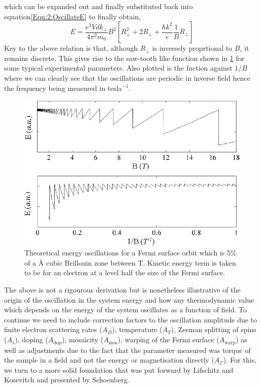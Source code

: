 which can be expanded out and finally substituted back into equation\ref{Eqn:2:OscillateE} to finally obtain,
\begin{equation}
\label{Eqn:2:OscIllustration}
E = \frac{e^2Vdk_\perp}{4\pi^2m_0}B^2\left[R_\perp^2 + 2R_\perp + \frac{\hbar k^2}{e}\frac{1}{B}R_\perp\right]
\end{equation}
Key to the above relation is that, although $R_\perp$ is inversely proprtional to $B$, it remains discrete. This gives rise to the saw-tooth like function shown in \fig\ref{Fig:2:EnergyOscillations} for some typical experimental parameters. Also plotted is the fuction against $1/B$ where we can clearly see that the oscillations are periodic in inverse field hence the frequency being measured in tesla$^{-1}$.
\begin{figure}[htbp]
    \begin{center}
        \includegraphics[scale=0.9]{Chapter2-ExperimentalTechnique/Figures/TheoreticalOscillations/TheoreticalOscillations}
        \caption{Theoretical energy oscillations for a Fermi surface orbit which is 5\% of a \unit[5]{\AA} cubic Brillouin zone between \unit[1--18]{T}. Kinetic energy term is taken to be for an electron at a level half the size of the Fermi surface.}
        \label{Fig:2:EnergyOscillations}
    \end{center}
\end{figure}

The above is not a rigourous derivation but is nonetheless illustrative of the origin of the oscillation in the system energy and how any thermodynamic value which depends on the energy of the system oscillates as a function of field. To continue we need to include correction factors to the oscillation amplitude due to finite electron scattering rates ($A_D$), temperature ($A_T$), Zeeman splitting of spins ($A_s$), doping ($A_{\textrm{dop}}$), mosaicity ($A_{\textrm{mos}}$), warping of the Fermi surface ($A_{\textrm{warp}}$) as well as adjustments due to the fact that the parameter measured was torque of the sample in a field and not the energy or magnetisation directly ($A_{\Gamma}$). For this, we turn to a more solid foundation that was put forward by Lifschitz and Kosevitch and presented by Schoenberg.

